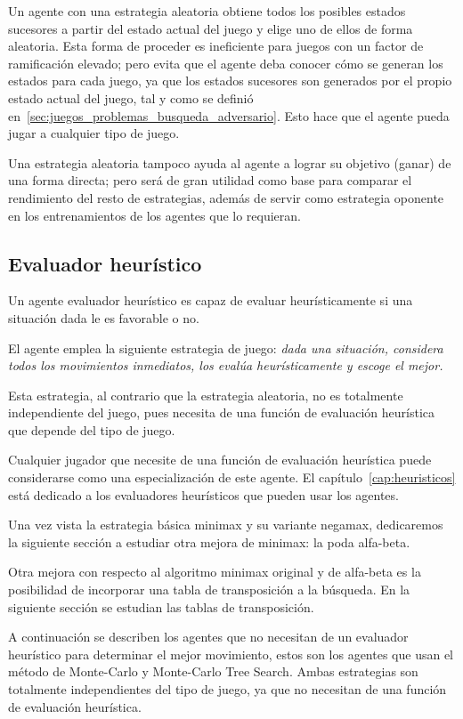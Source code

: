 Un agente con una estrategia aleatoria obtiene todos los posibles estados sucesores a partir del estado actual del juego y elige uno de ellos de forma aleatoria.
Esta forma de proceder es ineficiente para juegos con un factor de ramificación elevado;
pero evita que el agente deba conocer cómo se generan los estados para cada juego, ya que los estados sucesores son generados por el propio estado actual del juego, tal y como se definió en~\ref{sec:juegos_problemas_busqueda_adversario}.
Esto hace que el agente pueda jugar a cualquier tipo de juego.

Una estrategia aleatoria tampoco ayuda al agente a lograr su objetivo (ganar) de una forma directa;
pero será de gran utilidad como base para comparar el rendimiento del resto de estrategias, además de servir como estrategia oponente en los entrenamientos de los agentes que lo requieran. 

\subsection{Evaluador heurístico}
\label{ssec:evaluador_heuristico}
Un agente evaluador heurístico es capaz de evaluar heurísticamente si una situación dada le es favorable o no.

El agente emplea la siguiente estrategia de juego: \emph{dada una situación, considera todos los movimientos inmediatos, los evalúa heurísticamente y escoge el mejor.}

Esta estrategia, al contrario que la estrategia aleatoria, no es totalmente independiente del juego, pues necesita de una función de evaluación heurística que depende del tipo de juego.

Cualquier jugador que necesite de una función de evaluación heurística puede considerarse como una especialización de este agente.
El capítulo~\ref{cap:heuristicos} está dedicado a los evaluadores heurísticos que pueden usar los agentes.




\bigskip
Una vez vista la estrategia básica minimax y su variante negamax, dedicaremos la siguiente sección a estudiar otra mejora de minimax: la poda alfa-beta.



\bigskip
Otra mejora con respecto al algoritmo minimax original y de alfa-beta es la posibilidad de incorporar una tabla de transposición a la búsqueda.
En la siguiente sección se estudian las tablas de transposición.



\bigskip
A continuación se describen los agentes que no necesitan de un evaluador heurístico para determinar el mejor movimiento, estos son los agentes que usan el método de Monte-Carlo y Monte-Carlo Tree Search.
Ambas estrategias son totalmente independientes del tipo de juego, ya que no necesitan de una función de evaluación heurística.



